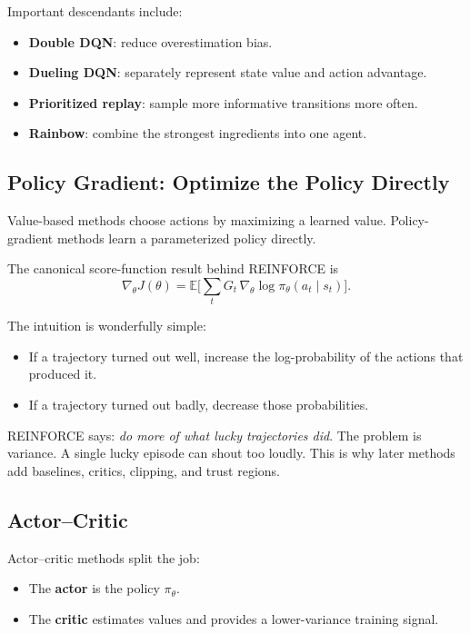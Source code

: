 \documentclass[11pt]{article}
\newcommand{\E}{\mathbb{E}}
\begin{document}
  Important descendants include:

  \begin{itemize}
    \item \textbf{Double DQN}: reduce overestimation bias.
    \item \textbf{Dueling DQN}: separately represent state value and action advantage.
    \item \textbf{Prioritized replay}: sample more informative transitions more often.
    \item \textbf{Rainbow}: combine the strongest ingredients into one agent.
  \end{itemize}

  \subsection{Policy Gradient: Optimize the Policy Directly}

  Value-based methods choose actions by maximizing a learned value. Policy-gradient methods learn a parameterized policy directly.

  The canonical score-function result behind REINFORCE is
  \[
  \nabla_\theta J(\theta) = \E\Biggl[\sum_t G_t\, \nabla_\theta \log \pi_\theta(a_t\mid s_t)\Biggr].
  \]

  The intuition is wonderfully simple:

  \begin{itemize}
    \item If a trajectory turned out well, increase the log-probability of the actions that produced it.
    \item If a trajectory turned out badly, decrease those probabilities.
  \end{itemize}

  \begin{intuitionbox}
  REINFORCE says: \emph{do more of what lucky trajectories did}. The problem is variance. A single lucky episode can shout too loudly. This is why later methods add baselines, critics, clipping, and trust regions.
  \end{intuitionbox}

  \subsection{Actor--Critic}

  Actor--critic methods split the job:

  \begin{itemize}
    \item The \textbf{actor} is the policy $\pi_\theta$.
    \item The \textbf{critic} estimates values and provides a lower-variance training signal.
  \end{itemize}
\end{document}
